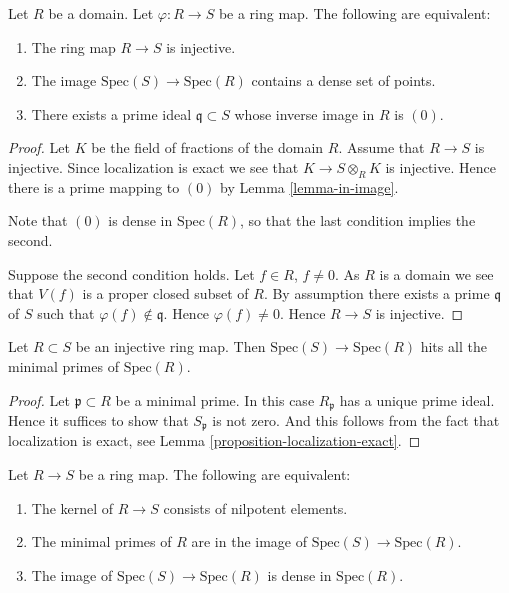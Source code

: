 \begin{lemma}
\label{lemma-domain-image-dense-set-points-generic-point}
Let $R$ be a domain. Let $\varphi : R \to S$ be a ring map.
The following are equivalent:
\begin{enumerate}
\item The ring map $R \to S$ is injective.
\item The image $\text{Spec}(S) \to \text{Spec}(R)$
contains a dense set of points.
\item There exists a prime ideal $\mathfrak q \subset S$
whose inverse image in $R$ is $(0)$.
\end{enumerate}
\end{lemma}

\begin{proof}
Let $K$ be the field of fractions of the domain $R$.
Assume that $R \to S$ is injective. Since localization
is exact we see that $K \to S \otimes_R K$ is injective.
Hence there is a prime mapping to $(0)$ by
Lemma \ref{lemma-in-image}.

\medskip\noindent
Note that $(0)$ is dense in $\text{Spec}(R)$, so that the
last condition implies the second.

\medskip\noindent
Suppose the second condition holds. Let $f \in R$,
$f \not = 0$. As $R$ is a domain we see that $V(f)$
is a proper closed subset of $R$. By assumption
there exists a prime $\mathfrak q$
of $S$ such that $\varphi(f) \not \in \mathfrak q$.
Hence $\varphi(f) \not = 0$.
Hence $R \to S$ is injective.
\end{proof}

\begin{lemma}
\label{lemma-injective-minimal-primes-in-image}
Let $R \subset S$ be an injective ring map.
Then $\text{Spec}(S) \to \text{Spec}(R)$
hits all the minimal primes of $\text{Spec}(R)$.
\end{lemma}

\begin{proof}
Let $\mathfrak p \subset R$ be a minimal prime.
In this case $R_{\mathfrak p}$ has a unique prime ideal.
Hence it suffices to show that $S_{\mathfrak p}$ is not zero.
And this follows from the fact that localization is exact,
see Lemma \ref{proposition-localization-exact}.
\end{proof}

\begin{lemma}
\label{lemma-image-dense-generic-points}
Let $R \to S$ be a ring map. The following are equivalent:
\begin{enumerate}
\item The kernel of $R \to S$ consists of nilpotent elements.
\item The minimal primes of $R$ are in the image of
$\text{Spec}(S) \to \text{Spec}(R)$.
\item The image of $\text{Spec}(S) \to \text{Spec}(R)$ is dense
in $\text{Spec}(R)$.
\end{enumerate}
\end{lemma}

